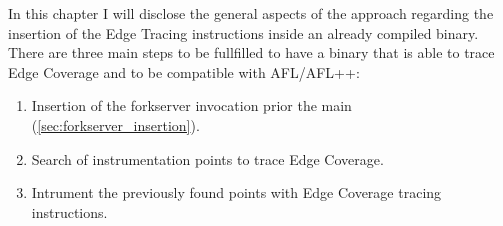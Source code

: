 In this chapter I will disclose the general aspects of the approach regarding the insertion of the Edge Tracing 
instructions inside an already compiled binary.\\
There are three main steps to be fullfilled to have a binary that is able to trace Edge Coverage and 
    to be compatible with AFL/AFL++:
    \begin{enumerate}
        \item Insertion of the forkserver invocation prior the main (\cref{sec:forkserver_insertion}).
        \item Search of instrumentation points to trace Edge Coverage.
        \item Intrument the previously found points with Edge Coverage tracing instructions.
    \end{enumerate}


